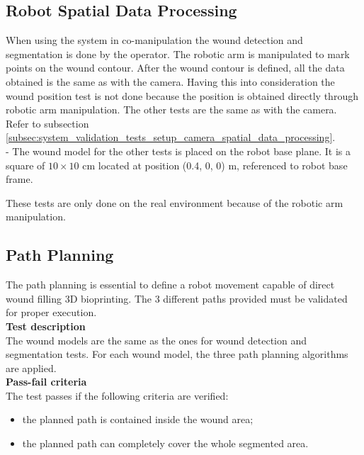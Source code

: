 

\subsection{Robot Spatial Data Processing}
\label{subsec:system_validation_tests_setup_robot_spatial_data_processing}

When using the system in co-manipulation the wound detection and segmentation is done by the operator. The robotic arm is manipulated to mark points on the wound contour. After the wound contour is defined, all the data obtained is the same as with the camera. Having this into consideration the wound position test is not done because the position is obtained directly through robotic arm manipulation. The other tests are the same as with the camera. Refer to subsection \ref{subsec:system_validation_tests_setup_camera_spatial_data_processing}.\\
-
The wound model for the other tests is placed on the robot base plane. It is a square of $10\times10$ \si{\centi\meter} located at position (0.4, 0, 0) \si{\meter}, referenced to robot base frame.

These tests are only done on the real environment because of the robotic arm manipulation.


\subsection{Path Planning}
\label{subsec:system_validation_tests_setup_path_planning}

The path planning is essential to define a robot movement capable of direct wound filling 3D bioprinting. The 3 different paths provided must be validated for proper execution.\\

\textbf{Test description}\\
The wound models are the same as the ones for wound detection and segmentation tests. For each wound model, the three path planning algorithms are applied.\\

\textbf{Pass-fail criteria}\\
The test passes if the following criteria are verified:
\begin{itemize}
    \item the planned path is contained inside the wound area;
    \item the planned path can completely cover the whole segmented area.
\end{itemize}

